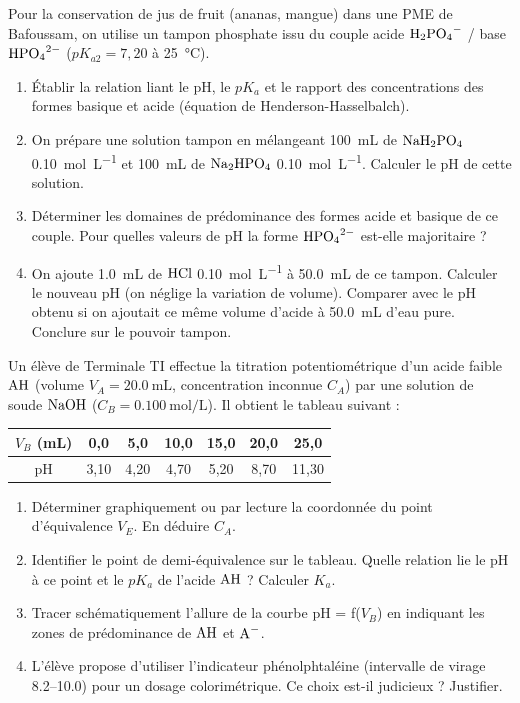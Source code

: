 \documentclass[11pt]{article}
\begin{document}
\begin{exercice}
\label{exo:tampon}
Pour la conservation de jus de fruit (ananas, mangue) dans une PME de Bafoussam, on utilise un tampon phosphate issu du couple acide $\ce{H2PO4-}$ / base $\ce{HPO4^{2-}}$ ($pK_{a2} = 7,20$ à \SI{25}{\celsius}).
\begin{enumerate}
    \item Établir la relation liant le pH, le $pK_a$ et le rapport des concentrations des formes basique et acide (équation de Henderson-Hasselbalch).
    \item On prépare une solution tampon en mélangeant \SI{100}{\milli\liter} de $\ce{NaH2PO4}$ \SI{0,10}{\mole\per\liter} et \SI{100}{\milli\liter} de $\ce{Na2HPO4}$ \SI{0,10}{\mole\per\liter}. Calculer le pH de cette solution.
    \item Déterminer les domaines de prédominance des formes acide et basique de ce couple. Pour quelles valeurs de pH la forme $\ce{HPO4^{2-}}$ est-elle majoritaire ?
    \item On ajoute \SI{1,0}{\milli\liter} de $\ce{HCl}$ \SI{0,10}{\mole\per\liter} à \SI{50,0}{\milli\liter} de ce tampon. Calculer le nouveau pH (on néglige la variation de volume). Comparer avec le pH obtenu si on ajoutait ce même volume d'acide à \SI{50,0}{\milli\liter} d'eau pure. Conclure sur le pouvoir tampon.
\end{enumerate}
\end{exercice}

\begin{exercice}
\label{exo:determination_Ka}
Un élève de Terminale TI effectue la titration potentiométrique d'un acide faible $\ce{AH}$ (volume $V_A = \SI{20,0}{\milli\liter}$, concentration inconnue $C_A$) par une solution de soude $\ce{NaOH}$ ($C_B = \SI{0,100}{\mole\per\liter}$). Il obtient le tableau suivant :
\begin{center}
\begin{tabular}{|c|c|c|c|c|c|c|}
\hline
$V_B$ (\si{\milli\liter}) & 0,0 & 5,0 & 10,0 & 15,0 & 20,0 & 25,0 \\
\hline
pH & 3,10 & 4,20 & 4,70 & 5,20 & 8,70 & 11,30 \\
\hline
\end{tabular}
\end{center}
\begin{enumerate}
    \item Déterminer graphiquement ou par lecture la coordonnée du point d'équivalence $V_E$. En déduire $C_A$.
    \item Identifier le point de demi-équivalence sur le tableau. Quelle relation lie le pH à ce point et le $pK_a$ de l'acide $\ce{AH}$ ? Calculer $K_a$.
    \item Tracer schématiquement l'allure de la courbe pH = f($V_B$) en indiquant les zones de prédominance de $\ce{AH}$ et $\ce{A-}$.
    \item L'élève propose d'utiliser l'indicateur phénolphtaléine (intervalle de virage \numrange{8,2}{10,0}) pour un dosage colorimétrique. Ce choix est-il judicieux ? Justifier.
\end{enumerate}
\end{exercice}
\end{document}
